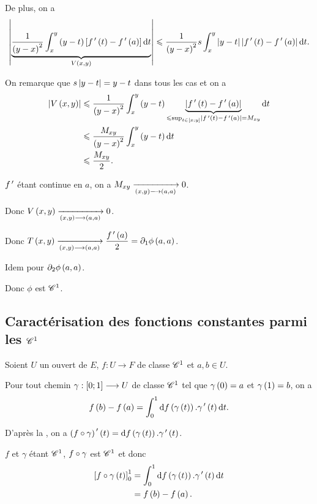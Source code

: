 \begin{corr}
De plus, on a \[\abs{\underbrace{\dfrac{1}{\paren{y-x}^2}\int_x^y\paren{y-t}\croch{f\prim\paren{t}-f\prim\paren{a}}\odif{t}}_{V\paren{x,y}}}\leq\dfrac{1}{\paren{y-x}^2}s\int_x^y\abs{y-t}\abs{f\prim\paren{t}-f\prim\paren{a}}\odif{t}.\]

On remarque que \(s\left\lvert y-t\right\rvert=y-t\) dans tous les cas et on a \[\begin{aligned}
\abs{V\paren{x,y}}&\leq\dfrac{1}{\paren{y-x}^2}\int_x^y\paren{y-t}\underbrace{\abs{f\prim\paren{t}-f\prim\paren{a}}}_{\leq\sup_{t\in\intervii{x}{y}}\abs{f\prim\paren{t}-f\prim\paren{a}}=M_{xy}}\odif{t} \\
&\leq\dfrac{M_{xy}}{\paren{y-x}^2}\int_x^y\paren{y-t}\odif{t} \\
&\leq\dfrac{M_{xy}}{2}.
\end{aligned}\]

\(f^{\,\prime}\) étant continue en \(a\), on a \(M_{xy}\xrightarrow[\left(x,y\right)\longrightarrow\left(a,a\right)]{}0\).

Donc \(V\left(x,y\right)\xrightarrow[\left(x,y\right)\longrightarrow\left(a,a\right)]{}0\).

Donc \(T\paren{x,y}\tendqd{\paren{x,y}\to\paren{a,a}}\dfrac{f\prim\paren{a}}{2}=\pdif{1}\phi\paren{a,a}\).

Idem pour \(\pdif{2}\phi\paren{a,a}\).

Donc \(\phi\) est \(\mathscr{C}^{1}\).
\end{corr}

\subsection{Caractérisation des fonctions constantes parmi les \(\mathscr{C}^{1}\)}

\begin{prop}
Soient \(U\) un ouvert de \(E\), \(f:U\to F\) de classe \(\mathscr{C}^{1}\) et \(a,b\in U\).

Pour tout chemin \(\gamma:\left[0;1\right]\longrightarrow U\) de classe \(\mathscr{C}^{1}\) tel que \(\gamma\left(0\right)=a\) et \(\gamma\left(1\right)=b\), on a \[f\paren{b}-f\paren{a}=\int_0^1\odif{f}\paren{\gamma\paren{t}}.\gamma\prim\paren{t}\odif{t}.\]
\end{prop}

\begin{dem}
D'après la , on a \(\paren{f\rond\gamma}\prim\paren{t}=\odif{f}\paren{\gamma\paren{t}}.\gamma\prim\paren{t}\).

\(f\) et \(\gamma\) étant \(\mathscr{C}^{1}\), \(f\circ\gamma\) est \(\mathscr{C}^{1}\) et donc \[\begin{aligned}
\croch{f\rond\gamma\paren{t}}_0^1&=\int_0^1\odif{f}\paren{\gamma\paren{t}}.\gamma\prim\paren{t}\odif{t} \\
&=f\paren{b}-f\paren{a}.
\end{aligned}\]
\end{dem}

